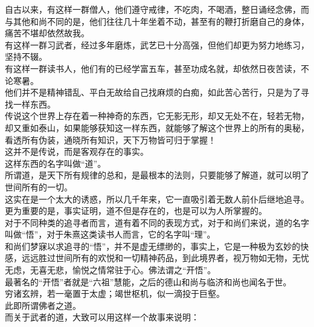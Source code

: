 \begin{multicols}{\theparacolNo}
自古以来，有这样一群僧人，他们遵守戒律，不吃肉，不喝酒，整日诵经念佛，而与其他和尚不同的是，他们往往几十年坐着不动，甚至有的鞭打折磨自己的身体，痛苦不堪却依然故我。\\

有这样一群习武者，经过多年磨炼，武艺已十分高强，但他们却更为努力地练习，坚持不辍。\\

有这样一群读书人，他们有的已经学富五车，甚至功成名就，却依然日夜苦读，不论寒暑。\\

他们并不是精神错乱、平白无故给自己找麻烦的白痴，如此苦心苦行，只是为了寻找一样东西。\\

传说这个世界上存在着一种神奇的东西，它无影无形，却又无处不在，轻若无物，却又重如泰山，如果能够获知这一样东西，就能够了解这个世界上的所有的奥秘，看透所有伪装，通晓所有知识，天下万物皆可归于掌握！\\

这并不是传说，而是客观存在的事实。\\

这样东西的名字叫做“道”。\\

所谓道，是天下所有规律的总和，是最根本的法则，只要能够了解道，就可以明了世间所有的一切。\\

这实在是一个太大的诱惑，所以几千年来，它一直吸引着无数人前仆后继地追寻。更为重要的是，事实证明，道不但是存在的，也是可以为人所掌握的。\\

对于不同种类的追寻者而言，道有着不同的表现方式，对于和尚们来说，道的名字叫做“悟”，对于朱熹这类读书人而言，它的名字叫“理”。\\

和尚们梦寐以求追寻的“悟”，并不是虚无缥缈的，事实上，它是一种极为玄妙的快感，远远胜过世间所有的欢悦和一切精神药品，到此境界者，视万物如无物，无忧无虑，无喜无悲，愉悦之情常驻于心。佛法谓之“开悟”。\\

最著名的“开悟”者就是“六祖”慧能，之后的德山和尚与临济和尚也闻名于世。\\

穷诸玄辨，若一毫置于太虚；竭世枢机，似一滴投于巨壑。\\

此即所谓佛者之道。\\

而关于武者的道，大致可以用这样一个故事来说明：\\


\end{multicols}
